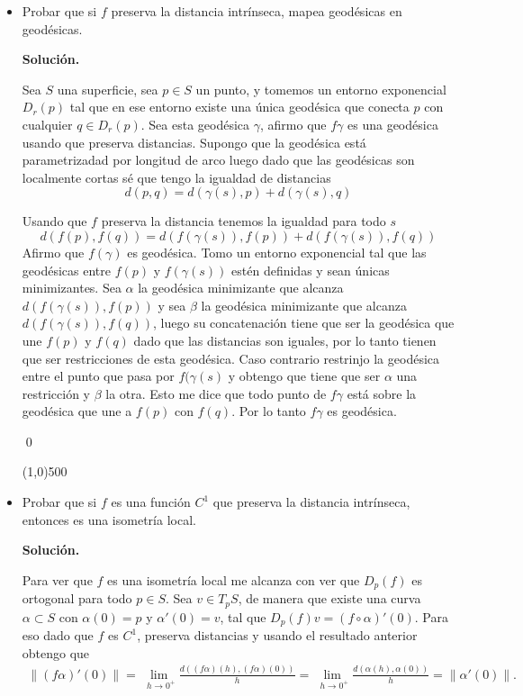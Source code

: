 \documentclass{article}
\newenvironment{exercise}[2][Ejercicio]{\begin{trivlist}
		\item[\hskip \labelsep {\bfseries #1}\hskip \labelsep {\bfseries #2.}]}{\end{trivlist}}
\begin{document}
\begin{exercise}{1}
\begin{itemize}
			\item[{(b)}] Probar que si $f$ preserva la distancia intr\'inseca, mapea geod\'esicas en geod\'esicas.
			
			\textbf{Solución.}
			
			Sea $S$ una superficie, sea $p \in S$ un punto, y tomemos un entorno exponencial $D_r(p)$ tal que en ese entorno existe una única geodésica que conecta $p$ con cualquier $q \in D_r(p)$. Sea esta geodésica $\gamma$, afirmo que $f\gamma$ es una geodésica usando que preserva distancias. Supongo que la geodésica está parametrizadad por longitud de arco luego dado que las geodésicas son localmente cortas sé que tengo la igualdad de distancias
			\[d(p,q) = d(\gamma(s),p) + d(\gamma(s),q)\]
			
			Usando que $f$ preserva la distancia tenemos la igualdad para todo $s$
			\[d(f(p),f(q)) = d(f(\gamma(s)),f(p)) + d(f(\gamma(s)),f(q))\]
			Afirmo que $f(\gamma)$ es geodésica. Tomo un entorno exponencial tal que las geodésicas entre $f(p)$ y $f(\gamma(s))$ estén definidas y sean únicas minimizantes. Sea $\alpha$ la geodésica minimizante que alcanza $d(f(\gamma(s)),f(p))$ y sea $\beta$ la geodésica minimizante que alcanza $d(f(\gamma(s)),f(q))$, luego su concatenación tiene que ser la geodésica que une $f(p)$ y $f(q)$ dado que las distancias son iguales, por lo tanto tienen que ser restricciones de esta geodésica. Caso contrario restrinjo la geodésica entre el punto que pasa por $f(\gamma(s)$ y obtengo que tiene que ser $\alpha$ una restricción y $\beta$ la otra. Esto me dice que todo punto de $f\gamma$ está sobre la geodésica que une a $f(p)$ con $f(q)$. Por lo tanto $f\gamma$ es geodésica.
			
			 
			\qed
			
			\line(1,0){500}
			
			\bigskip
			
			
			\item[(c)] Probar que si $f$ es una funci\'on $C^1$ que preserva la distancia intr\'inseca, entonces es una isometr\'ia local.
			
			\textbf{Solución.}
			
			Para ver que $f$ es una isometría local me alcanza con ver que $D_p (f)$ es ortogonal para todo $p\in S$. Sea $v \in T_pS$, de manera que existe una curva $\alpha \subset S$ con $\alpha(0) = p$ y $\alpha'(0) = v$, tal que $D_p(f)v = (f \circ \alpha)'(0)$.  Para eso dado que $f$ es $C^1$, preserva distancias y usando el resultado anterior obtengo que
			\begin{align*}
			\|(f\alpha)'(0)\| = \lim_{\ \ h \to 0^+} \frac{d((f\alpha)(h),(f\alpha)(0))}{h} = \lim_{\ \ h \to 0^+} \frac{d(\alpha(h),\alpha(0))}{h} = \|\alpha'(0)\|.
			\end{align*}
			

\end{itemize}
\end{exercise}
\end{document}
